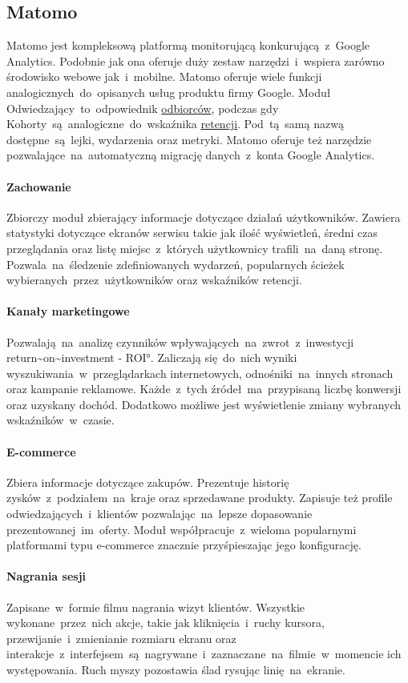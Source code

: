 \subsection{Matomo}
\label{sec:matomo}
Matomo jest kompleksową platformą monitorującą konkurującą~z~Google Analytics. Podobnie jak ona oferuje duży zestaw narzędzi~i~wspiera zarówno środowisko webowe jak~i~mobilne. Matomo oferuje wiele funkcji analogicznych~do~opisanych usług produktu firmy Google. Moduł Odwiedzający~to~odpowiednik \hyperref[par:ga-audiences]{odbiorców}, podczas gdy Kohorty~są~analogiczne~do~wskaźnika \hyperref[par:ga-retention]{retencji}. Pod~tą~samą nazwą dostępne~są~lejki, wydarzenia oraz metryki. Matomo oferuje też narzędzie pozwalające~na~automatyczną migrację danych~z~konta Google Analytics.

\paragraph{Zachowanie}
Zbiorczy moduł zbierający informacje dotyczące działań użytkowników. Zawiera statystyki dotyczące ekranów serwisu takie jak ilość wyświetleń, średni czas przeglądania oraz listę miejsc~z~których użytkownicy trafili~na~daną stronę. Pozwala~na~śledzenie zdefiniowanych wydarzeń, popularnych ścieżek wybieranych~przez~użytkowników oraz wskaźników retencji.

\paragraph{Kanały marketingowe}
Pozwalają~na~analizę czynników wpływających~na~zwrot~z~inwestycji \ang{return~on~investment - ROI}. Zaliczają się~do~nich wyniki wyszukiwania~w~przeglądarkach internetowych, odnośniki~na~innych stronach oraz kampanie reklamowe. Każde~z~tych źródeł~ma~przypisaną liczbę konwersji oraz uzyskany dochód. Dodatkowo możliwe jest wyświetlenie zmiany wybranych wskaźników~w~czasie.

\paragraph{E-commerce}
Zbiera informacje dotyczące zakupów. Prezentuje historię zysków~z~podziałem~na~kraje oraz sprzedawane produkty. Zapisuje też profile odwiedzających~i~klientów pozwalając~na~lepsze dopasowanie prezentowanej~im~oferty. Moduł współpracuje~z~wieloma popularnymi platformami typu e-commerce znacznie przyśpieszając jego konfigurację.

\paragraph{Nagrania sesji}
Zapisane~w~formie filmu nagrania wizyt klientów. Wszystkie wykonane~przez~nich akcje, takie jak kliknięcia~i~ruchy kursora, przewijanie~i~zmienianie rozmiaru ekranu oraz interakcje~z~interfejsem~są~nagrywane~i~zaznaczane~na~filmie~w~momencie ich występowania. Ruch myszy pozostawia ślad rysując linię~na~ekranie.

